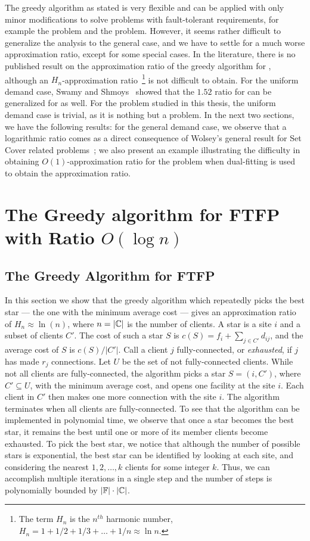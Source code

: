 \documentclass[oneside,final]{ucr}
\begin{document}
The greedy algorithm as stated is very flexible and can be
applied with only minor modifications to solve problems with
fault-tolerant requirements, for example the {\FTFL}
problem and the {\FTFP} problem. However, it seems rather
difficult to generalize the analysis to the general case,
and we have to settle for a much worse approximation ratio,
except for some special cases. In the literature, there is
no published result on the approximation ratio of the greedy
algorithm for {\FTFL}, although an $H_n$-approximation
ratio~\footnote{The term $H_n$ is the $n^{th}$ harmonic
  number, $H_n = 1 + 1/2 + 1/3 + \ldots + 1/n \approx \ln
  n$.} is not difficult to obtain. For the uniform demand
case, Swamy and Shmoys~\cite{SwamyS08} showed that the
$1.52$ ratio for {\UFL} can be generalized for {\FTFL} as
well. For the {\FTFP} problem studied in this thesis, the
uniform demand case is trivial, as it is nothing but a
{\UFL} problem. In the next two sections, we have the
following results: for the general demand case, we observe
that a logarithmic ratio comes as a direct consequence of
Wolsey's general result for Set Cover related
problems~\cite{Wolsey88}; we also present an example
illustrating the difficulty in obtaining
$O(1)$-approximation ratio for the {\FTFP} problem when
dual-fitting is used to obtain the approximation ratio.

\section{The Greedy algorithm for FTFP with Ratio $O(\log n)$}
\label{sec: greedy_ratio}

\subsection{The Greedy Algorithm for FTFP}
In this section we show that the greedy algorithm which
repeatedly picks the best star --- the one with the minimum
average cost --- gives an approximation ratio of $H_n
\approx \ln(n)$, where $n=|\mathbb{C}|$ is the number of
clients. A star is a site $i$ and a subset of clients
$C'$. The cost of such a star $S$ is $c(S) = f_i +
\sum_{j\in C'} d_{ij}$, and the average cost of $S$ is $c(S)
/ |C'|$. Call a client $j$ fully-connected, or
\emph{exhausted}, if $j$ has made $r_j$ connections. Let $U$
be the set of not fully-connected clients. While not all
clients are fully-connected, the algorithm picks a star
$S=(i,C')$, where $C' \subseteq U$, with the minimum average
cost, and opens one facility at the site $i$. Each client in
$C'$ then makes one more connection with the site $i$. The
algorithm terminates when all clients are
fully-connected. To see that the algorithm can be
implemented in polynomial time, we observe that once a star
becomes the best star, it remains the best until one or more
of its member clients become exhausted. To pick the best
star, we notice that although the number of possible stars
is exponential, the best star can be identified by looking
at each site, and considering the nearest $1,2,\ldots,k$
clients for some integer $k$. Thus, we can accomplish
multiple iterations in a single step and the number of steps
is polynomially bounded by $|\mathbb{F}|\cdot|\mathbb{C}|$.
\end{document}
